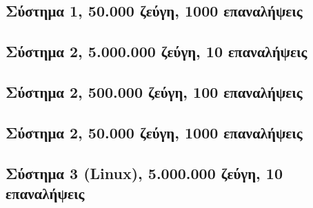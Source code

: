 \subsection*{Σύστημα 1, 50.000 ζεύγη, 1000 επαναλήψεις}\begin{center}
\tabcolsep=0.11cm
\scalebox{0.5}{
}
\scalebox{0.9}{
}\end{center}
\newpage

\subsection*{Σύστημα 2, 5.000.000 ζεύγη, 10 επαναλήψεις}
\begin{center}
\tabcolsep=0.11cm
\scalebox{0.55}{}
\scalebox{0.9}{
}\end{center}
\newpage

\subsection*{Σύστημα 2, 500.000 ζεύγη, 100 επαναλήψεις}\begin{center}
\tabcolsep=0.11cm
\scalebox{0.5}{
}
\scalebox{0.9}{
}\end{center}
\newpage

\subsection*{Σύστημα 2, 50.000 ζεύγη, 1000 επαναλήψεις}\begin{center}
\tabcolsep=0.11cm
\scalebox{0.5}{
}
\scalebox{0.9}{
}\end{center}
\newpage

\subsection*{Σύστημα 3 (Linux), 5.000.000 ζεύγη, 10 επαναλήψεις}
\begin{center}
\tabcolsep=0.11cm
\scalebox{0.55}{}
\scalebox{0.9}{
}\end{center}
\newpage

